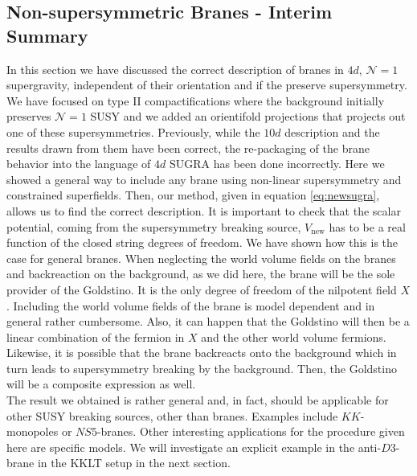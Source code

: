 \documentclass[12pt]{report}
\begin{document}
\subsection{Non-supersymmetric Branes - Interim Summary}
In this section we have discussed the correct description of branes in $4d$, $\mathcal{N}=1$ supergravity, independent of their orientation and if the preserve supersymmetry. We have focused on type II compactifications where the background initially preserves $\mathcal{N}=1$ SUSY and we added an orientifold projections that projects out one of these supersymmetries. Previously, while the $10d$ description and the results drawn from them have been correct, the re-packaging of  the brane behavior into the language of $4d$ SUGRA has been done incorrectly. Here we showed a general way to include any brane using non-linear supersymmetry and constrained superfields. Then, our method, given in equation \eqref{eq:newsugra}, allows us to find the correct description. It is important to check that the scalar potential, coming from the supersymmetry breaking source, $V_{\text{new}}$ has to be a real function of the closed string degrees of freedom. We have shown how this is the case for general branes. When neglecting the world volume fields on the branes and backreaction on the background, as we did here, the brane will be the sole provider of the Goldstino. It is the only degree of freedom of the nilpotent field $X$. Including the world volume fields of the brane is model dependent and in general rather cumbersome. Also, it can happen that the Goldstino will then be a linear combination of the fermion in $X$ and the other world volume fermions. Likewise, it is possible that the brane backreacts onto the background which in turn leads to supersymmetry breaking by the background. Then, the Goldstino will be a composite expression as well.\\
The result we obtained is rather general and, in fact, should be applicable for other SUSY breaking sources, other than branes. Examples include $KK$-monopoles or $NS5$-branes. Other interesting applications for the procedure given here are specific models. We will investigate an explicit example in the anti-$D3$-brane in the KKLT setup in the next section.
\end{document}
